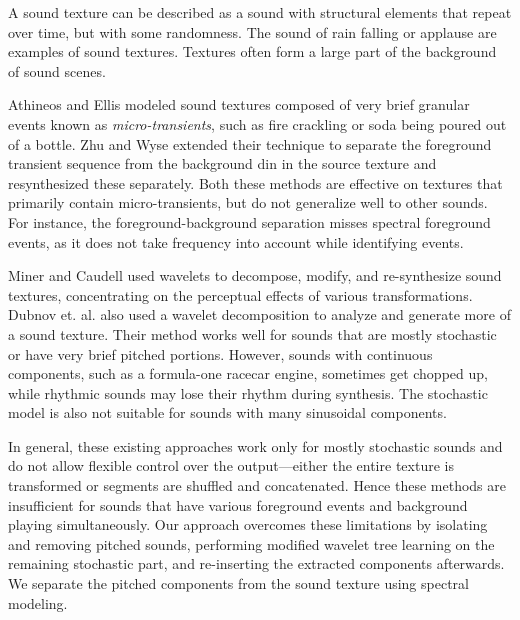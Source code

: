 \documentclass[a4paper]{article}
\begin{document}
A sound texture can be described as a sound with structural elements 
that repeat over time, but with some randomness. The sound of rain falling 
or applause are examples of sound textures. 
Textures often form a large part of the background of sound scenes.

Athineos and Ellis \cite{Athineos03} modeled sound textures composed of
very brief granular events known as \textit{micro-transients}, such as 
fire crackling or soda being poured out of a bottle. 
Zhu and Wyse \cite{Zhu04} extended their technique to separate 
the foreground transient sequence from the background din in the source 
texture and resynthesized these separately. Both these methods are effective on textures 
that primarily contain micro-transients, but do not generalize well to other sounds. For 
instance, the foreground-background separation misses spectral foreground events, as it does 
not take frequency into account while identifying events.

Miner and Caudell \cite{Miner97} used wavelets to decompose, 
modify, and re-synthesize sound textures, concentrating 
on the perceptual effects of various transformations. 
Dubnov et. al. \cite{Dubnov02} also used a wavelet decomposition to 
analyze and generate more of a sound texture. 
Their method works well for sounds that are mostly 
stochastic or have very brief pitched portions. However, sounds with 
continuous components, such as a formula-one racecar engine, sometimes 
get chopped up, while rhythmic sounds may lose their rhythm during 
synthesis. The stochastic model is also not suitable for sounds with 
many sinusoidal components.
 
In general, these existing approaches work only for mostly stochastic sounds and 
do not allow flexible control over the output---either the entire texture is 
transformed or segments are shuffled and concatenated. Hence 
these methods are insufficient for sounds that have various foreground events and 
background playing simultaneously.
Our approach overcomes these limitations by isolating and removing 
pitched sounds, performing modified wavelet tree learning 
\cite{Dubnov02} on the  
remaining stochastic part, and re-inserting the extracted components 
afterwards. We separate the pitched components from the sound texture 
using spectral modeling.

\end{document}
